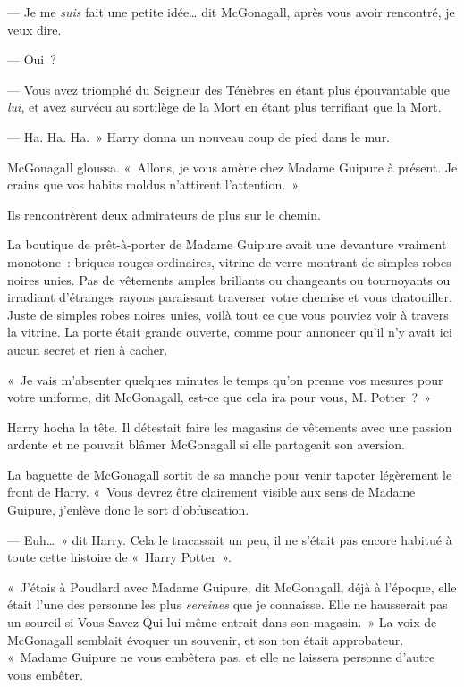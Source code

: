 --- Je me \emph{suis} fait une petite idée… dit McGonagall, après vous avoir rencontré, je veux dire.

--- Oui~?

--- Vous avez triomphé du Seigneur des Ténèbres en étant plus épouvantable que \emph{lui}, et avez survécu au sortilège de la Mort en étant plus terrifiant que la Mort.

--- Ha. Ha. Ha.~» Harry donna un nouveau coup de pied dans le mur.

McGonagall gloussa. «~Allons, je vous amène chez Madame Guipure à présent. Je crains que vos habits moldus n'attirent l'attention.~»

Ils rencontrèrent deux admirateurs de plus sur le chemin.

\later

La boutique de prêt-à-porter de Madame Guipure avait une devanture vraiment monotone~: briques rouges ordinaires, vitrine de verre montrant de simples robes noires unies. Pas de vêtements amples brillants ou changeants ou tournoyants ou irradiant d'étranges rayons paraissant traverser votre chemise et vous chatouiller. Juste de simples robes noires unies, voilà tout ce que vous pouviez voir à travers la vitrine. La porte était grande ouverte, comme pour annoncer qu'il n'y avait ici aucun secret et rien à cacher.

«~Je vais m'absenter quelques minutes le temps qu'on prenne vos mesures pour votre uniforme, dit McGonagall, est-ce que cela ira pour vous, M. Potter~?~»

Harry hocha la tête. Il détestait faire les magasins de vêtements avec une passion ardente et ne pouvait blâmer McGonagall si elle partageait son aversion.

La baguette de McGonagall sortit de sa manche pour venir tapoter légèrement le front de Harry. «~Vous devrez être clairement visible aux sens de Madame Guipure, j'enlève donc le sort d'obfuscation.

--- Euh…~» dit Harry. Cela le tracassait un peu, il ne s'était pas encore habitué à toute cette histoire de «~Harry Potter~».

«~J'étais à Poudlard avec Madame Guipure, dit McGonagall, déjà à l'époque, elle était l'une des personne les plus \emph{sereines} que je connaisse. Elle ne hausserait pas un sourcil si Vous-Savez-Qui lui-même entrait dans son magasin.~» La voix de McGonagall semblait évoquer un souvenir, et son ton était approbateur. «~Madame Guipure ne vous embêtera pas, et elle ne laissera personne d'autre vous embêter.

